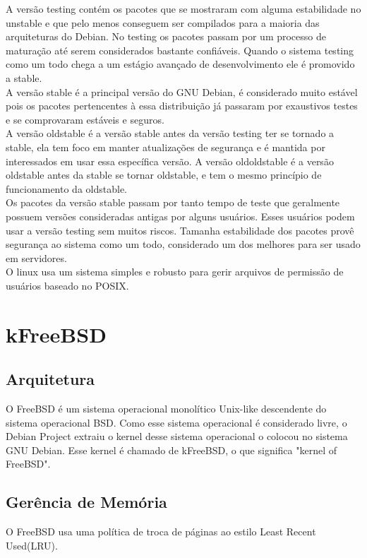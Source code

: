 \documentclass[conference]{IEEEtran}
\begin{document}
A versão testing contém os pacotes que se mostraram com alguma estabilidade no unstable e que pelo menos conseguem ser compilados para a maioria das arquiteturas do Debian. No testing os pacotes passam por um processo de maturação até serem considerados bastante confiáveis. Quando o sistema testing como um todo chega a um estágio avançado de desenvolvimento ele é promovido a stable.\\

A versão stable é a principal versão do GNU Debian, é considerado muito estável pois os pacotes pertencentes à essa distribuição já passaram por exaustivos testes e se comprovaram estáveis e seguros.\\

A versão oldstable é a versão stable antes da versão testing ter se tornado a stable, ela tem foco em manter atualizações de segurança e é mantida por interessados em usar essa específica versão. A versão oldoldstable é a versão oldstable antes da stable se tornar oldstable, e tem o mesmo princípio de funcionamento da oldstable.\\

Os pacotes da versão stable passam por tanto tempo de teste que geralmente possuem versões consideradas antigas por alguns usuários. Esses usuários podem usar a versão testing sem muitos riscos. Tamanha estabilidade dos pacotes provê segurança ao sistema como um todo, considerado um dos melhores para ser usado em servidores\cite{DebianVersions}.\\

O linux usa um sistema simples e robusto para gerir arquivos de permissão de usuários baseado no POSIX\cite{GruposUsuarioLinux}.\\
\section{kFreeBSD}\label{sec:BSD}
\subsection{Arquitetura}\label{sec:BSDArq}
O FreeBSD é um sistema operacional monolítico Unix-like descendente do sistema operacional BSD. Como esse sistema operacional é considerado livre, o Debian Project extraiu o kernel desse sistema operacional o colocou no sistema GNU Debian. Esse kernel é chamado de kFreeBSD, o que significa "kernel of FreeBSD".\cite{Debian-kFreeBSD-wiki}
\subsection{Gerência de Memória}\label{sec:BSDMem}
O FreeBSD usa uma política de troca de páginas ao estilo Least Recent Used(LRU).\cite{FreeBsdArc}
\end{document}
